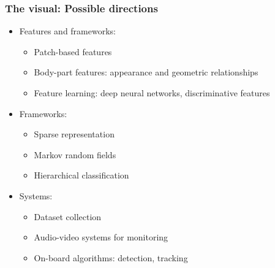 \documentclass[mathserif]{beamer}
\begin{document}
\begin{frame}
\frametitle{The visual: Possible directions}
\begin{itemize}
\item<2-> Features and frameworks: 
\begin{itemize}
\item Patch-based features 
\item Body-part features: appearance and geometric relationships
\item Feature learning: deep neural networks, discriminative features
\end{itemize}
\item<3-> Frameworks:
\begin{itemize}
\item Sparse representation
\item Markov random fields
\item Hierarchical classification 
\end{itemize}
\item<4-> Systems:
\begin{itemize}
\item Dataset collection
\item Audio-video systems for monitoring
\item On-board algorithms: detection, tracking
\end{itemize}
\end{itemize}
\end{frame}
\end{document}
